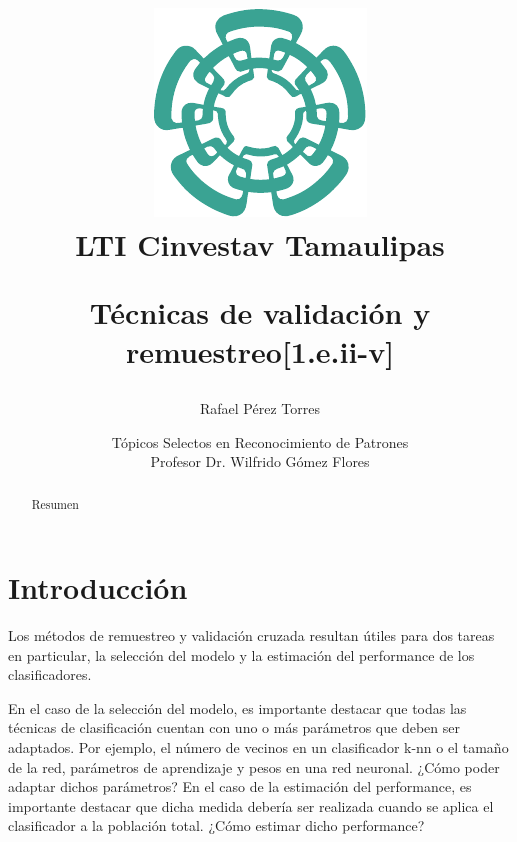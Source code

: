 \documentclass{article}
\begin{document}
\title{
	\begin{figure}[!ht]
	\centering
		\includegraphics[scale=0.8]{resources/images/cinvestav-logo}
		\\[0.5cm]LTI Cinvestav Tamaulipas
	\end{figure}
	\vspace{1cm}
	Técnicas de validación y remuestreo{\small[1.e.ii-v]}
	\vspace{1cm}
}
	
\author{Rafael Pérez Torres}	
		
\date{
	Tópicos Selectos en Reconocimiento de Patrones \\ 
	\vspace{0.8cm}
	Profesor Dr. Wilfrido Gómez Flores \\
	\vspace{1cm}
}

\maketitle

\begin{abstract}
Resumen
\end{abstract}

\section{Introducción}
Los métodos de remuestreo y validación cruzada resultan útiles para dos tareas en particular, la selección del modelo y la estimación del performance de los clasificadores.

En el caso de la selección del modelo, es importante destacar que todas las técnicas de clasificación cuentan con uno o más parámetros que deben ser adaptados.
Por ejemplo, el número de vecinos en un clasificador k-nn o el tamaño de la red, parámetros de aprendizaje y pesos en una red neuronal.
¿Cómo poder adaptar dichos parámetros?
En el caso de la estimación del performance, es importante destacar que dicha medida debería ser realizada cuando se aplica el clasificador a la población total.
¿Cómo estimar dicho performance?
\end{document}
